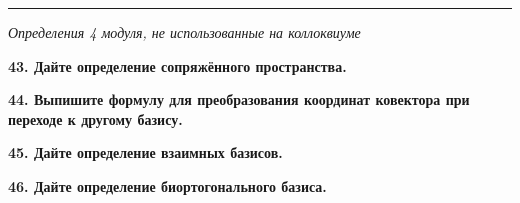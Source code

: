 \documentclass[11pt,a4paper]{article}
\begin{document}
\color{gray}
\rule{\linewidth}{0.3mm}

\begin{center}
\textit{Определения 4 модуля, не использованные на коллоквиуме}
\end{center}

\textbf{43. Дайте определение сопряжённого пространства.\\}

\textbf{44. Выпишите формулу для преобразования координат ковектора при переходе к другому базису.\\}

\textbf{45. Дайте определение взаимных базисов.\\}

\textbf{46. Дайте определение биортогонального базиса.\\}
\end{document}

